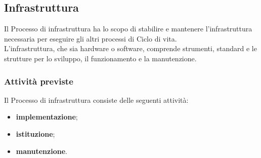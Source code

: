 \documentclass[a4paper,12pt]{article}
\begin{document}
\subsection{Infrastruttura}
\label{sec:infrastruttura}
Il Processo di infrastruttura ha lo scopo di stabilire e mantenere l'infrastruttura necessaria per eseguire gli altri processi di Ciclo di vita.\\L'infrastruttura, che sia hardware o software, comprende strumenti, standard e le strutture per lo sviluppo, il funzionamento e la manutenzione.

\subsubsection{Attività previste}
Il Processo di infrastruttura consiste delle seguenti attività:
\begin{itemize}
    \item \textbf{implementazione};
    \item \textbf{istituzione};
    \item \textbf{manutenzione}.
\end{itemize}
\end{document}
